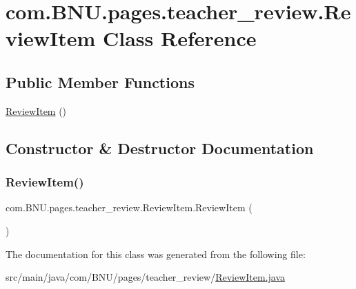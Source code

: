 \hypertarget{classcom_1_1_b_n_u_1_1pages_1_1teacher__review_1_1_review_item}{}\section{com.\+B\+N\+U.\+pages.\+teacher\+\_\+review.\+Review\+Item Class Reference}
\label{classcom_1_1_b_n_u_1_1pages_1_1teacher__review_1_1_review_item}
\subsection*{Public Member Functions}
\begin{DoxyCompactItemize}
\item 
\mbox{\hyperlink{classcom_1_1_b_n_u_1_1pages_1_1teacher__review_1_1_review_item_acd3b6f5ce6c4ae5e4c7b19de016e0b62}{Review\+Item}} ()
\end{DoxyCompactItemize}


\subsection{Constructor \& Destructor Documentation}
\mbox{\label{classcom_1_1_b_n_u_1_1pages_1_1teacher__review_1_1_review_item_acd3b6f5ce6c4ae5e4c7b19de016e0b62}} 
\subsubsection{\texorpdfstring{Review\+Item()}{ReviewItem()}}
{\footnotesize\ttfamily com.\+B\+N\+U.\+pages.\+teacher\+\_\+review.\+Review\+Item.\+Review\+Item (\begin{DoxyParamCaption}{ }\end{DoxyParamCaption})}



The documentation for this class was generated from the following file\+:\begin{DoxyCompactItemize}
\item 
src/main/java/com/\+B\+N\+U/pages/teacher\+\_\+review/\mbox{\hyperlink{_review_item_8java}{Review\+Item.\+java}}\end{DoxyCompactItemize}
